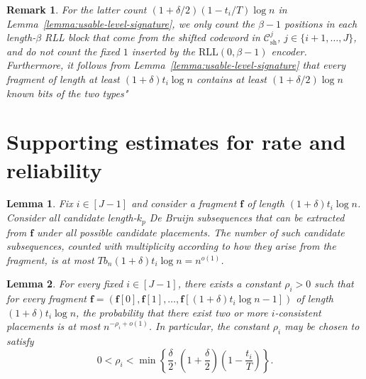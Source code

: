 \documentclass[10pt,a4paper]{amsart}
\newtheorem{lemma}{Lemma}
\newtheorem{remark}{Remark}
\newcommand{\boldf}{\mathbf{f}}
\newcommand{\cC}{\mathcal{C}}
\begin{document}
\begin{remark}\label{remark:special bits in S_j}
For the latter count $(1+\delta/2)(1-t_i/T)\log n$ in Lemma~\ref{lemma:usable-level-signature}, we only count the $\beta-1$ positions in each
length-$\beta$ RLL block that come from the shifted codeword in
$\cC_{\mathrm{sh}}^j$, $j\in\{i+1,\ldots,J\}$, and do not count the fixed $1$ inserted by the $\mathrm{RLL}(0,\beta-1)$ encoder.
Furthermore, it follows from Lemma~\ref{lemma:usable-level-signature} that every fragment of length at least $(1+\delta)t_i\log n$ contains at least $(1+\delta/2)\log n$ known bits of the two types"
\end{remark}

\section{Supporting estimates for rate and reliability}\label{appendix:rate-reliability-estimates}

\begin{lemma}\label{lemma:number-of-debruijn-subsequences-in-fragment}
Fix $i\in[J-1]$ and consider a fragment $\boldf$ of length
$(1+\delta)t_i\log n$.
Consider all candidate length-$k_p$ De Bruijn subsequences that can be
extracted from $\boldf$ under all possible candidate placements.
The number of such candidate subsequences, counted with multiplicity
according to how they arise from the fragment, is at most
\(Tb_n(1+\delta)t_i\log n=n^{o(1)}\).
\end{lemma}

\begin{lemma}\label{lemma:recycled-fragment-ambiguity}
For every fixed \(i\in[J-1]\), there exists a constant \(\rho_i>0\) such that for every fragment $\boldf=(\boldf[0],\boldf[1],\ldots,\boldf[(1+\delta)t_i\log n-1])$ of length \((1+\delta)t_i\log n\), the probability that there exist two or more $i$-consistent placements 
is at most $n^{-\rho_i+o(1)}$.
In particular, the constant \(\rho_i\) may be chosen to satisfy
\[
0<\rho_i<
\min\left\{
\frac{\delta}{2},
\left(1+\frac{\delta}{2}\right)\left(1-\frac{t_i}{T}\right)
\right\}.
\]
\end{lemma}
\end{document}
